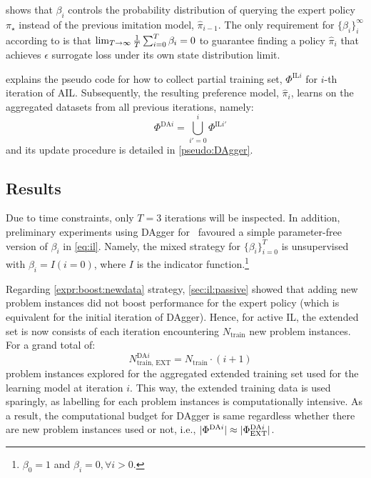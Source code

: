 \documentclass[twocolumn]{svjour3}
\begin{document}
 shows that $\beta_i$ controls the probability distribution of 
querying the expert policy $\pi_\star$ instead of the previous imitation model, 
$\hat{\pi}_{i-1}$. 
The only requirement for $\{\beta_i\}_i^\infty$ according to \cite{RossGB11} is 
that $\limit{\frac{1}{T}\sum_{i=0}^T\beta_i}{T\to\infty}{0}$ to guarantee 
finding a policy $\hat{\pi}_i$ that achieves $\epsilon$ surrogate loss under 
its own state distribution limit.

 explains the pseudo code for how to collect 
partial training set, $\Phi^{\text{IL}i}$ for $i$-th iteration of AIL.
Subsequently, the resulting preference model, $\hat{\pi}_i$, learns on the 
aggregated datasets from all previous iterations, namely:
\begin{equation}\quad\label{eq:DAgger}
\Phi^{\text{DA}i}=\bigcup_{i'=0}^{i}\Phi^{\text{IL}i'}
\end{equation}
and its update procedure is detailed in \cref{pseudo:DAgger}.




\subsection{Results}\label{sec:ail:expr}
Due to time constraints, only $T=3$ iterations will be inspected.
In addition, preliminary experiments using DAgger for \JSP\ favoured a 
simple parameter-free version of $\beta_i$ in \cref{eq:il}. 
Namely, the mixed strategy for $\{\beta_i\}_{i=0}^T$ is unsupervised 
with $\beta_i=I(i=0)$, where $I$ is the indicator 
function.\footnote{$\beta_0=1$ and $\beta_i=0,\forall i>0$.}

Regarding \ref{expr:boost:newdata} strategy, \cref{sec:il:passive} showed that 
adding new problem instances did not boost performance for the expert policy 
(which is equivalent for the initial iteration of DAgger). 
Hence, for active IL, the extended set is now consists of each iteration 
encountering $N_{\text{train}}$ new problem instances. For a grand total of: 
\begin{equation}\quad
N^{\text{DA}i}_{\text{train, EXT}}=N_{\text{train}}\cdot (i+1) 
\end{equation}
problem instances explored for the aggregated extended training set used for 
the learning model at iteration $i$.
This way, the extended training data is used sparingly, as labelling for each 
problem instances is computationally intensive. As a result, the computational 
budget for DAgger is same regardless whether there are new problem instances 
used or not, i.e., 
$\abs{\Phi^{\text{DA}i}}\approx\abs{\Phi^{\text{DA}i}_{\text{EXT}}}$.
\end{document}
